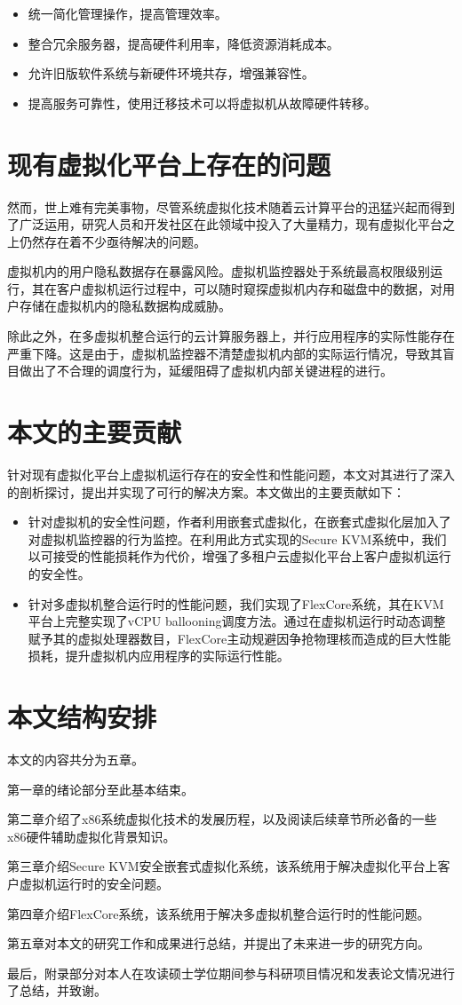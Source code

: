 \begin{itemize}
\item 统一简化管理操作，提高管理效率。
\item 整合冗余服务器，提高硬件利用率，降低资源消耗成本。
\item 允许旧版软件系统与新硬件环境共存，增强兼容性。
\item 提高服务可靠性，使用迁移技术可以将虚拟机从故障硬件转移。
\end{itemize}

\section{现有虚拟化平台上存在的问题}

然而，世上难有完美事物，尽管系统虚拟化技术随着云计算平台的迅猛兴起而得到了广泛运用，研究人员和开发社区在此领域中投入了大量精力，现有虚拟化平台之上仍然存在着不少亟待解决的问题。

虚拟机内的用户隐私数据存在暴露风险。虚拟机监控器处于系统最高权限级别运行，其在客户虚拟机运行过程中，可以随时窥探虚拟机内存和磁盘中的数据，对用户存储在虚拟机内的隐私数据构成威胁。

除此之外，在多虚拟机整合运行的云计算服务器上，并行应用程序的实际性能存在严重下降。这是由于，虚拟机监控器不清楚虚拟机内部的实际运行情况，导致其盲目做出了不合理的调度行为，延缓阻碍了虚拟机内部关键进程的进行。

\section{本文的主要贡献}

针对现有虚拟化平台上虚拟机运行存在的安全性和性能问题，本文对其进行了深入的剖析探讨，提出并实现了可行的解决方案。本文做出的主要贡献如下：

\begin{itemize}
\item 针对虚拟机的安全性问题，作者利用嵌套式虚拟化，在嵌套式虚拟化层加入了对虚拟机监控器的行为监控。在利用此方式实现的Secure KVM系统中，我们以可接受的性能损耗作为代价，增强了多租户云虚拟化平台上客户虚拟机运行的安全性。
\item 针对多虚拟机整合运行时的性能问题，我们实现了FlexCore系统，其在KVM平台上完整实现了vCPU ballooning调度方法。通过在虚拟机运行时动态调整赋予其的虚拟处理器数目，FlexCore主动规避因争抢物理核而造成的巨大性能损耗，提升虚拟机内应用程序的实际运行性能。
\end{itemize}

\section{本文结构安排}

本文的内容共分为五章。

第一章的绪论部分至此基本结束。

第二章介绍了x86系统虚拟化技术的发展历程，以及阅读后续章节所必备的一些x86硬件辅助虚拟化背景知识。

第三章介绍Secure KVM安全嵌套式虚拟化系统，该系统用于解决虚拟化平台上客户虚拟机运行时的安全问题。

第四章介绍FlexCore系统，该系统用于解决多虚拟机整合运行时的性能问题。

第五章对本文的研究工作和成果进行总结，并提出了未来进一步的研究方向。

最后，附录部分对本人在攻读硕士学位期间参与科研项目情况和发表论文情况进行了总结，并致谢。



